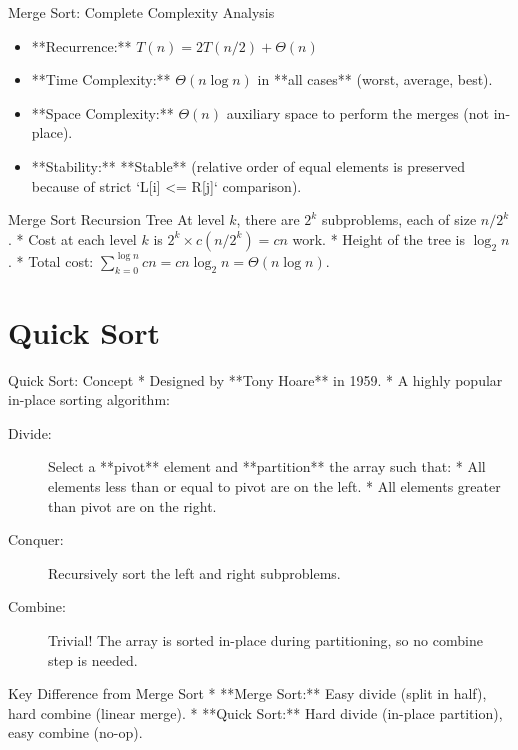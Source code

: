 \documentclass[aspectratio=169,xcolor=dvipsnames]{beamer}
\begin{document}
\begin{frame}{Merge Sort: Complete Complexity Analysis}
  \begin{itemize}
    \item **Recurrence:** $T(n) = 2T(n/2) + \Theta(n)$
    \item **Time Complexity:** $\Theta(n \log n)$ in **all cases** (worst, average, best).
    \item **Space Complexity:** $\Theta(n)$ auxiliary space to perform the merges (not in-place).
    \item **Stability:** **Stable** (relative order of equal elements is preserved because of strict `L[i] <= R[j]` comparison).
  \end{itemize}
  \begin{block}{Merge Sort Recursion Tree}
    At level $k$, there are $2^k$ subproblems, each of size $n/2^k$.
    * Cost at each level $k$ is $2^k \times c(n/2^k) = cn$ work.
    * Height of the tree is $\log_2 n$.
    * Total cost: $\sum_{k=0}^{\log n} cn = cn \log_2 n = \Theta(n \log n)$.
  \end{block}
\end{frame}

\section{Quick Sort}

\begin{frame}{Quick Sort: Concept}
  * Designed by **Tony Hoare** in 1959.
  * A highly popular in-place sorting algorithm:
    \begin{description}
      \item[Divide:] Select a **pivot** element and **partition** the array such that:
        * All elements less than or equal to pivot are on the left.
        * All elements greater than pivot are on the right.
      \item[Conquer:] Recursively sort the left and right subproblems.
      \item[Combine:] Trivial! The array is sorted in-place during partitioning, so no combine step is needed.
    \end{description}
  \begin{block}{Key Difference from Merge Sort}
    * **Merge Sort:** Easy divide (split in half), hard combine (linear merge).
    * **Quick Sort:** Hard divide (in-place partition), easy combine (no-op).
  \end{block}
\end{frame}
\end{document}
